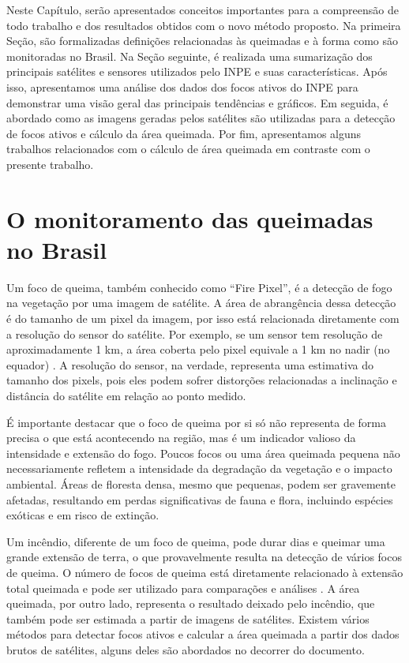 \documentclass[cic,tc]{iiufrgs}
\begin{document}
Neste Capítulo, serão apresentados conceitos importantes para a compreensão de todo trabalho e dos resultados obtidos com o novo método proposto. Na primeira Seção, são formalizadas definições relacionadas às queimadas e à forma como são monitoradas no Brasil. Na Seção seguinte, é realizada uma sumarização dos principais satélites e sensores utilizados pelo INPE e suas características. Após isso, apresentamos uma análise dos dados dos focos ativos do INPE para demonstrar uma visão geral das principais tendências e gráficos. Em seguida, é abordado como as imagens geradas pelos satélites são utilizadas para a detecção de focos ativos e cálculo da área queimada. Por fim, apresentamos alguns trabalhos relacionados com o cálculo de área queimada em contraste com o presente trabalho. \par

\section{O monitoramento das queimadas no Brasil}

Um foco de queima, também conhecido como ``Fire Pixel'', é a detecção de fogo na vegetação por uma imagem de satélite. A área de abrangência dessa detecção é do tamanho de um pixel da imagem, por isso está relacionada diretamente com a resolução do sensor do satélite. Por exemplo, se um sensor tem resolução de aproximadamente 1 km, a área coberta pelo pixel equivale a 1 km no nadir (no equador) \cite{PerguntasFrequentesINPE}. A resolução do sensor, na verdade, representa uma estimativa do tamanho dos pixels, pois eles podem sofrer distorções relacionadas a inclinação e distância do satélite em relação ao ponto medido. 

É importante destacar que o foco de queima por si só não representa de forma precisa o que está acontecendo na região, mas é um indicador valioso da intensidade e extensão do fogo. Poucos focos ou uma área queimada pequena não necessariamente refletem a intensidade da degradação da vegetação e o impacto ambiental. Áreas de floresta densa, mesmo que pequenas, podem ser gravemente afetadas, resultando em perdas significativas de fauna e flora, incluindo espécies exóticas e em risco de extinção.

Um incêndio, diferente de um foco de queima, pode durar dias e queimar uma grande extensão de terra, o que provavelmente resulta na detecção de vários focos de queima. O número de focos de queima está diretamente relacionado à extensão total queimada e pode ser utilizado para comparações e análises \citep{giglio2010assessing}. A área queimada, por outro lado, representa o resultado deixado pelo incêndio, que também pode ser estimada a partir de imagens de satélites. Existem vários métodos para detectar focos ativos e calcular a área queimada a partir dos dados brutos de satélites, alguns deles são abordados no decorrer do documento. 
\end{document}
